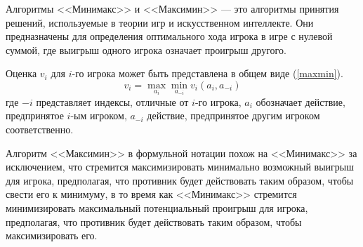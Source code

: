Алгоритмы <<Минимакс>> и <<Максимин>> --- это алгоритмы принятия решений, используемые в теории игр и искусственном интеллекте. Они предназначены для определения оптимального хода игрока в игре с нулевой суммой, где выигрыш одного игрока означает проигрыш другого.

Оценка $v_i$ для $i$-го игрока может быть представлена в общем виде (\ref{maxmin}).
\begin{equation}\label{maxmin}
    v_i = \max_{a_i} \min_{a_{-i}} v_i(a_i, a_{-i})
\end{equation}
где $-i$ представляет индексы, отличные от $i$-го игрока, $a_i$ обозначает действие, предпринятое $i$-ым игроком, $a_{-i}$ действие, предпринятое другим игроком соответственно.

Алгоритм <<Максимин>> в формульной нотации похож на <<Минимакс>> за исключением, что стремится максимизировать минимально возможный выигрыш для игрока, предполагая, что противник будет действовать таким образом, чтобы свести его к минимуму, в то время как <<Минимакс>> стремится минимизировать максимальный потенциальный проигрыш для игрока, предполагая, что противник будет действовать таким образом, чтобы максимизировать его.
